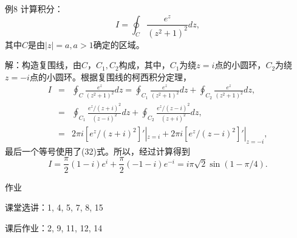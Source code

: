 \documentclass[11pt]{beamer}
\newcommand{\kong}[1][0.5]{\vspace{#1cm}}
\begin{document}
\begin{frame}{例8}
计算积分：
\begin{equation}
I = \oint_C \frac{e^z}{(z^2+1)^2} dz,
\end{equation}
其中$C$是由$|z|=a,a>1$确定的区域。

解：构造复围线，由$C，C_1,C_2$构成，其中，$C_1$为绕$z=i$点的小圆环，$C_2$为绕$z=-i$点的小圆环。根据复围线的柯西积分定理，
\begin{eqnarray}
I &=& \oint_C \frac{e^z}{(z^2+1)^2} dz = \oint_{C_1} \frac{e^z}{(z^2+1)^2} dz + \oint_{C_2} \frac{e^z}{(z^2+1)^2} dz, \nonumber\\
&=& \oint_{C_1} \frac{e^z/(z+i)^2}{(z-i)^2} dz + \oint_{C_2} \frac{e^z/(z-i)^2}{(z+i)^2} dz, \nonumber\\
&=& 2 \pi i [e^z/(z+i)^2]'|_{z=i} + 2\pi i[e^z/(z-i)^2]'|_{z=-i},
\end{eqnarray}
最后一个等号使用了(32)式。所以，经过计算得到
\begin{equation}
I = \frac{\pi}{2}(1-i)e^i + \frac{\pi }{2}(-1-i)e^{-i}
= i\pi \sqrt{2}\sin(1-\pi/4).
\end{equation}
\end{frame}

\begin{frame}{作业}

课堂选讲：1, 4, 5, {\color{blue}7, 8, 15}

\kong[1]
课后作业：2, 9, 11, 12, 14

\end{frame}
\end{document}
